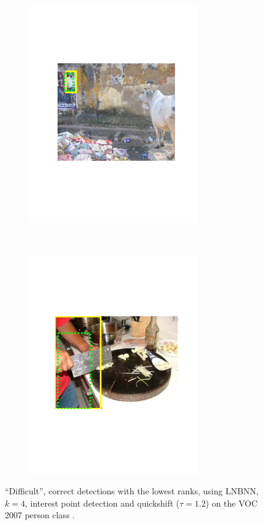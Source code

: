 \begin{figure}[hbt]
    \begin{subfigure}[b]{0.37\textwidth}
        \centering
        \includegraphics[width=0.8\textwidth]{TP30932}
        \caption{}
        \label{fig:dettn3}
    \end{subfigure}
    ~
    \begin{subfigure}[b]{0.37\textwidth}
        \centering
        \includegraphics[width=0.8\textwidth]{TP30705}
        \caption{}
        \label{fig:dettn4}
    \end{subfigure}
    \caption{``Difficult'', correct detections with the lowest ranks, using LNBNN, $k=4$, interest point detection and quickshift ($\tau=1.2$) on the VOC 2007 person class \cite{pascal-voc-2007}.}
    \label{fig:dettn}
\end{figure}


